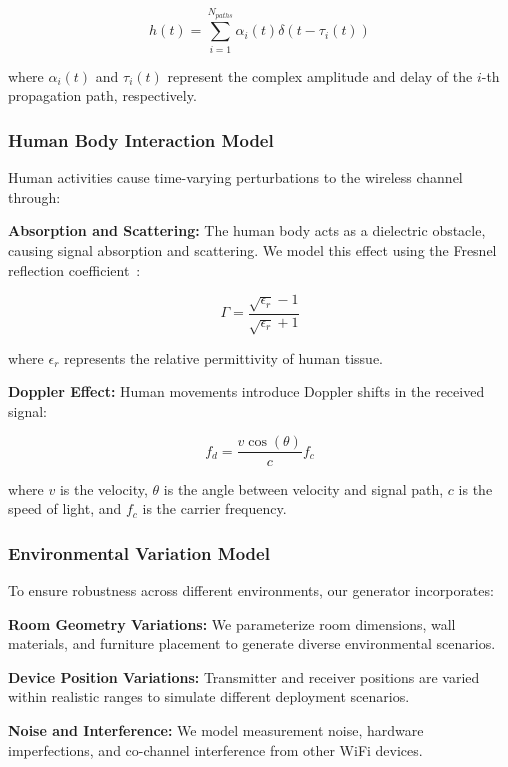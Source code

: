 \documentclass[journal]{IEEEtran}
\begin{document}
\begin{equation}
h(t) = \sum_{i=1}^{N_{paths}} \alpha_i(t) \delta(t - \tau_i(t))
\end{equation}

where $\alpha_i(t)$ and $\tau_i(t)$ represent the complex amplitude and delay of the $i$-th propagation path, respectively.

\subsubsection{Human Body Interaction Model}

Human activities cause time-varying perturbations to the wireless channel through:

\textbf{Absorption and Scattering:} The human body acts as a dielectric obstacle, causing signal absorption and scattering. We model this effect using the Fresnel reflection coefficient~\cite{fresnel_reflection1995}:

\begin{equation}
\Gamma = \frac{\sqrt{\epsilon_r} - 1}{\sqrt{\epsilon_r} + 1}
\end{equation}

where $\epsilon_r$ represents the relative permittivity of human tissue.

\textbf{Doppler Effect:} Human movements introduce Doppler shifts in the received signal:

\begin{equation}
f_d = \frac{v \cos(\theta)}{c} f_c
\end{equation}

where $v$ is the velocity, $\theta$ is the angle between velocity and signal path, $c$ is the speed of light, and $f_c$ is the carrier frequency.

\subsubsection{Environmental Variation Model}

To ensure robustness across different environments, our generator incorporates:

\textbf{Room Geometry Variations:} We parameterize room dimensions, wall materials, and furniture placement to generate diverse environmental scenarios.

\textbf{Device Position Variations:} Transmitter and receiver positions are varied within realistic ranges to simulate different deployment scenarios.

\textbf{Noise and Interference:} We model measurement noise, hardware imperfections, and co-channel interference from other WiFi devices.
\end{document}
